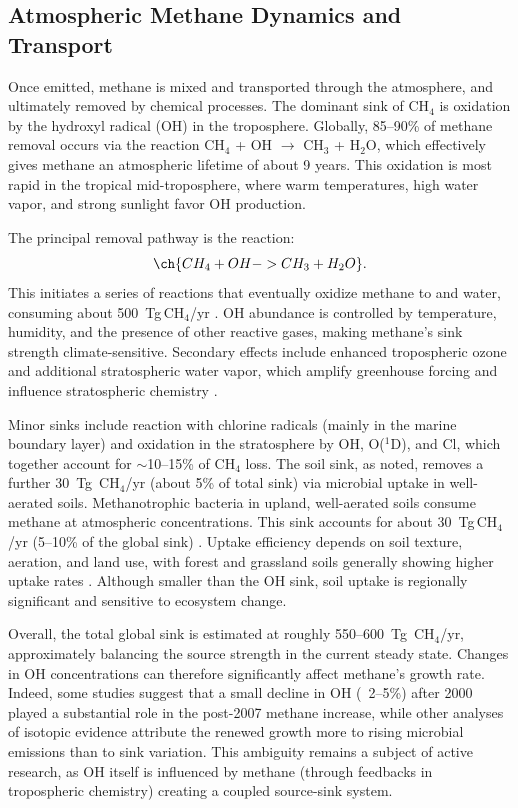 \subsection{Atmospheric Methane Dynamics and Transport}

Once emitted, methane is mixed and transported through the atmosphere, and ultimately removed by chemical processes. The dominant sink of CH$_4$ is oxidation by the hydroxyl radical (OH) in the troposphere. Globally, 85--90\% of methane removal occurs via the reaction CH$_4$ + OH $\rightarrow$ CH$_3$ + H$_2$O, which effectively gives methane an atmospheric lifetime of about 9 years. This oxidation is most rapid in the tropical mid-troposphere, where warm temperatures, high water vapor, and strong sunlight favor OH production.

The principal removal pathway is the reaction:
\[ \ch{CH_4 + OH -> CH_3 + H_2O}. \]
This initiates a series of reactions that eventually oxidize methane to  and water, consuming about 500~Tg\,CH$_4$/yr \cite{chen_estimation_2006}. OH abundance is controlled by temperature, humidity, and the presence of other reactive gases, making methane's sink strength climate-sensitive. Secondary effects include enhanced tropospheric ozone and additional stratospheric water vapor, which amplify greenhouse forcing and influence stratospheric chemistry \cite{Etminan2016, Shindell2012}.

Minor sinks include reaction with chlorine radicals (mainly in the marine boundary layer) and oxidation in the stratosphere by OH, O($^1$D), and Cl, which together account for $\sim$10--15\% of CH$_4$ loss. The soil sink, as noted, removes a further 30~Tg~CH$_4$/yr (about 5\% of total sink) via microbial uptake in well-aerated soils. Methanotrophic bacteria in upland, well-aerated soils consume methane at atmospheric concentrations. This sink accounts for about 30~Tg\,CH$_4$/yr (5--10\% of the global sink) \cite{Saunois2020, global_methane_budget}. Uptake efficiency depends on soil texture, aeration, and land use, with forest and grassland soils generally showing higher uptake rates \cite{Serata2023}. Although smaller than the OH sink, soil uptake is regionally significant and sensitive to ecosystem change.

Overall, the total global sink is estimated at roughly 550--600~Tg~CH$_4$/yr, approximately balancing the source strength in the current steady state. Changes in OH concentrations can therefore significantly affect methane's growth rate. Indeed, some studies suggest that a small decline in OH (~2--5\%) after 2000 played a substantial role in the post-2007 methane increase, while other analyses of isotopic evidence attribute the renewed growth more to rising microbial emissions than to sink variation. This ambiguity remains a subject of active research, as OH itself is influenced by methane (through feedbacks in tropospheric chemistry) creating a coupled source-sink system.


